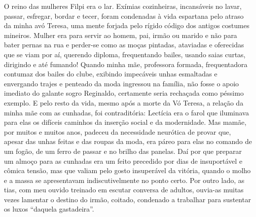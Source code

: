 O reino das mulheres Filpi era o lar. 
Exímias cozinheiras, incansáveis no lavar, passar, esfregar, bordar e tecer, foram condenadas à vida espartana pelo atraso da minha avó Teresa, uma mente forjada pelo rígido código dos antigos costumes mineiros. 
Mulher era para servir ao homem, pai, irmão ou marido e não para bater pernas na rua e perder-se como as moças pintadas, ataviadas e oferecidas que se viam por aí, querendo diploma, frequentando bailes, usando saias curtas, dirigindo e até fumando! Quando minha mãe, professora formada, frequentadora contumaz dos bailes do clube, exibindo impecáveis unhas esmaltadas e envergando trajes e penteado da moda ingressou na família, não fosse o apoio imediato do galante sogro Reginaldo, certamente seria rechaçada como péssimo exemplo. 
E pelo resto da vida, mesmo após a morte da Vó Teresa, a relação da minha mãe com as cunhadas, foi contraditória: Lectícia era o farol que iluminava para elas os difíceis caminhos da inserção social e da modernidade. 
Mas mamãe, por muitos e muitos anos, padeceu da necessidade neurótica de provar que, apesar das unhas feitas e das roupas da moda, era páreo para elas no comando de um fogão, de um ferro de passar e no brilho das panelas. 
Daí por que preparar um almoço para as cunhadas era um feito precedido por dias de insuportável e cômica tensão, mas que valiam pelo gosto insuperável da vitória, quando o molho e a massa se apresentavam indiscutivelmente no ponto certo. 
Por outro lado, as tias, com meu ouvido treinado em escutar conversa de adultos, ouvia-as muitas vezes lamentar o destino do irmão, coitado, condenado a trabalhar para sustentar os luxos “daquela gastadeira”.

